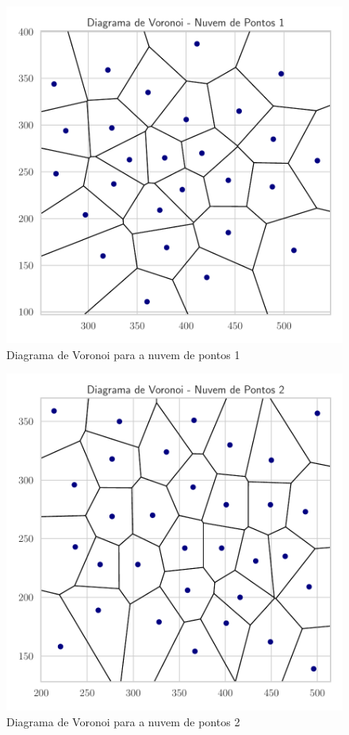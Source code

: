 \documentclass{article}
\begin{document}
\begin{figure}[H]
  \centering
  \includegraphics[scale=0.6]{plot_voronoi1.pdf}
  \caption{Diagrama de Voronoi para a nuvem de pontos 1}
  \label{fig:nuvem1}
\end{figure}

\begin{figure}[H]
  \centering
  \includegraphics[scale=0.6]{plot_voronoi2.pdf}
  \caption{Diagrama de Voronoi para a nuvem de pontos 2}
  \label{fig:nuvem2}
\end{figure}
\end{document}
